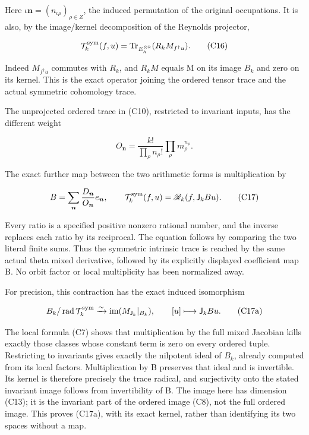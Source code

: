 Here \(\iota\boldsymbol n=(n_{\iota\rho})_{\rho\in Z}\), the induced permutation of the original occupations. It is also, by the image/kernel decomposition of the Reynolds projector,

\[
\mathcal T_k^{\rm sym}(f,u)
=\operatorname{Tr}_{E_h^{\otimes k}}(R_kM_{f^\dagger u}).
\tag{C16}
\]

Indeed \(M_{f^\dagger u}\) commutes with \(R_k\), and \(R_kM\) equals M on its image \(B_k\) and zero on its kernel. This is the exact operator joining the ordered tensor trace and the actual symmetric cohomology trace.

The unprojected ordered trace in (C10), restricted to invariant inputs, has the different weight

\[
O_{\boldsymbol n}=\frac{k!}{\prod_\rho n_\rho!}
\prod_\rho m_\rho^{n_\rho}.
\]

The exact further map between the two arithmetic forms is multiplication by

\[
B=\sum_{\boldsymbol n}\frac{D_{\boldsymbol n}}{O_{\boldsymbol n}}e_{\boldsymbol n},
\qquad
\mathcal T_k^{\rm sym}(f,u)=\mathscr R_k(f,\mathsf J_k B u).
\tag{C17}
\]

Every ratio is a specified positive nonzero rational number, and the inverse replaces each ratio by its reciprocal. The equation follows by comparing the two literal finite sums. Thus the symmetric intrinsic trace is reached by the same actual theta mixed derivative, followed by its explicitly displayed coefficient map B. No orbit factor or local multiplicity has been normalized away.

For precision, this contraction has the exact induced isomorphism

\[
B_k/\operatorname{rad}\mathcal T_k^{\rm sym}
\xrightarrow{\sim}\operatorname{im}(M_{\mathsf J_k}|_{B_k}),
\qquad[u]\longmapsto\mathsf J_k B u.
\tag{C17a}
\]

The local formula (C7) shows that multiplication by the full mixed Jacobian kills exactly those classes whose constant term is zero on every ordered tuple. Restricting to invariants gives exactly the nilpotent ideal of \(B_k\), already computed from its local factors. Multiplication by B preserves that ideal and is invertible. Its kernel is therefore precisely the trace radical, and surjectivity onto the stated invariant image follows from invertibility of B. The image here has dimension (C13); it is the invariant part of the ordered image (C8), not the full ordered image. This proves (C17a), with its exact kernel, rather than identifying its two spaces without a map.

